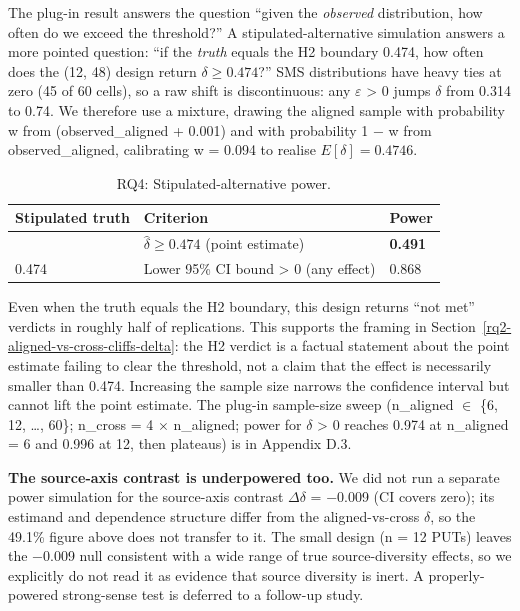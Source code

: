 \documentclass[12pt]{article}
\begin{document}
The plug-in result answers the question ``given the \emph{observed}
distribution, how often do we exceed the threshold?'' A
stipulated-alternative simulation answers a more pointed question: ``if
the \emph{truth} equals the H2 boundary 0.474, how often does the (12,
48) design return $\delta \geq 0.474$?'' SMS distributions have heavy ties at zero
(45 of 60 cells), so a raw shift is discontinuous: any $\varepsilon$ \textgreater{}
0 jumps $\delta$ from 0.314 to 0.74. We therefore use a mixture, drawing the
aligned sample with probability w from (observed\_aligned + 0.001) and
with probability 1 − w from observed\_aligned, calibrating w = 0.094 to
realise $E[\delta] = 0.4746$.

{\def\LTcaptype{table} %
\begin{longtable}[]{@{}lll@{}}
\caption{RQ4: Stipulated-alternative power.}\label{tab:p2-11}\\
\toprule\noalign{}
Stipulated truth & Criterion & Power \\
\midrule\noalign{}
\endfirsthead
\endhead
\bottomrule\noalign{}
\endlastfoot
0.474 & $\hat{\delta} \geq 0.474$ (point estimate) & \textbf{0.491} \\
0.474 & Lower 95\% CI bound \textgreater{} 0 (any effect) & 0.868 \\
\end{longtable}
}

Even when the truth equals the H2 boundary, this design returns ``not
met'' verdicts in roughly half of replications. This supports the
framing in Section~\ref{rq2-aligned-vs-cross-cliffs-delta}: the H2 verdict is a factual statement about the point
estimate failing to clear the threshold, not a claim that the effect is
necessarily smaller than 0.474. Increasing the sample size narrows the
confidence interval but cannot lift the point estimate. The plug-in
sample-size sweep (n\_aligned $\in$ \{6, 12, \ldots, 60\}; n\_cross = 4 $\times$
n\_aligned; power for $\delta$ \textgreater{} 0 reaches 0.974 at n\_aligned = 6
and 0.996 at 12, then plateaus) is in Appendix D.3.

\textbf{The source-axis contrast is underpowered too.} We did not run a
separate power simulation for the source-axis contrast $\Delta\delta$ =
−0.009 (CI covers zero); its estimand and dependence structure differ
from the aligned-vs-cross $\delta$, so the 49.1\% figure above does not
transfer to it. The small design (n = 12 PUTs) leaves the −0.009 null
consistent with a wide range of true source-diversity effects, so we
explicitly do not read it as evidence that source diversity is inert. A
properly-powered strong-sense test is deferred to a follow-up study.
\end{document}

